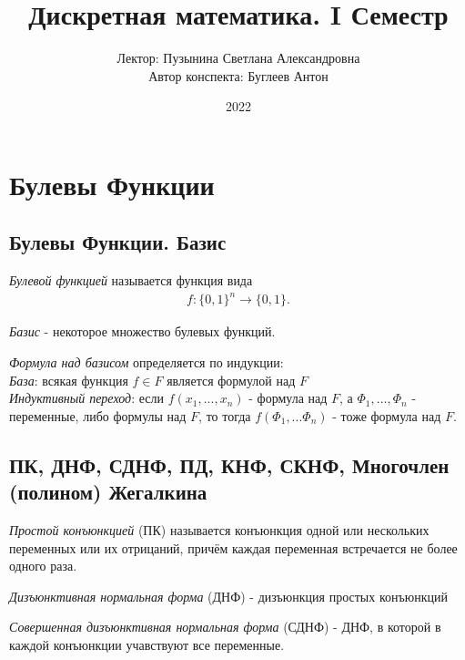 \documentclass[a4paper, 14pt]{article}
\title{Дискретная математика. I Семестр}
\author{Лектор: Пузынина Светлана Александровна \\
        Автор конспекта: Буглеев Антон}
\date{2022}
\begin{document}
    
    \maketitle
    \newpage

    \section{Булевы Функции}
    
    \subsection*{Булевы Функции. Базис}
    \begin{definition}
        {\it Булевой функцией} называется функция вида
        \begin{align*}
            f : \{0, 1\}^n \rightarrow \{0, 1\}.
        \end{align*}
    \end{definition}

    \begin{definition}
        {\it Базис} - некоторое множество булевых функций.
    \end{definition}
    
    \begin{definition}
        {\it Формула над базисом} определяется по индукции: \\
        {\it База}: всякая функция $f \in F$ является формулой над $F$ \\
        {\it Индуктивный переход}: если $f(x_1, ..., x_n)$ - формула над $F$,
        а $\Phi_1, ..., \Phi_n$ - переменные, либо формулы над $F$, то тогда
        $f(\Phi_1, ... \Phi_n)$ - тоже формула над $F$.
    \end{definition}


    \subsection*{ПК, ДНФ, СДНФ, ПД, КНФ, СКНФ, Многочлен (полином) Жегалкина}
    \begin{definition}
        {\it Простой конъюнкцией} (ПК) называется конъюнкция одной или нескольких переменных
        или их отрицаний, причём каждая переменная встречается не более одного раза.
    \end{definition}
    \begin{definition}
        {\it Дизъюнктивная нормальная форма} (ДНФ) - дизъюнкция простых конъюнкций
    \end{definition}
    \begin{definition}
        {\it Совершенная дизъюнктивная нормальная форма} (СДНФ) - ДНФ, в которой в
        каждой конъюнкции учавствуют все переменные. 
    \end{definition}
\end{document}
